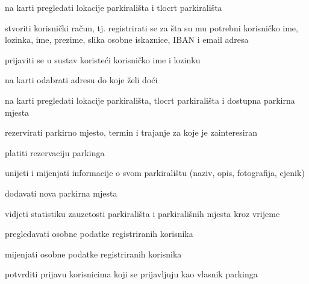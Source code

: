			
			\begin{packed_enum}
				\item  {}
				
				\begin{packed_enum}
					\item na karti pregledati lokacije parkirališta i tlocrt parkirališta
					\item stvoriti korisnički račun, tj. registrirati se za šta su mu potrebni korisničko ime, lozinka,  ime, prezime, slika osobne iskaznice, IBAN i email adresa 
				\end{packed_enum}
			
				\item  {}
				
				\begin{packed_enum}
					\item prijaviti se u sustav koristeći korisničko ime i lozinku
					\item na karti odabrati adresu do koje želi doći
					\item na karti pregledati lokacije parkirališta, tlocrt parkirališta i dostupna parkirna mjesta
					\item rezervirati parkirno mjesto, termin i trajanje za koje je zainteresiran
					\item platiti rezervaciju parkinga 
				\end{packed_enum}
				
				\item  {}
				
				\begin{packed_enum}
					\item unijeti i mijenjati informacije o svom parkiralištu (naziv, opis, fotografija, cjenik)
					\item dodavati nova parkirna mjesta
					\item vidjeti statistiku zauzetosti parkirališta i parkirališnih mjesta kroz vrijeme
			 	\end{packed_enum}
			 	
				\item  {}
				
				\begin{packed_enum}
					\item pregledavati osobne podatke registriranih korisnika
					\item mijenjati osobne podatke registriranih korisnika
					\item potvrditi prijavu korisnicima koji se prijavljuju kao vlasnik parkinga
					
				\end{packed_enum}
			\end{packed_enum}
			\eject 
			
